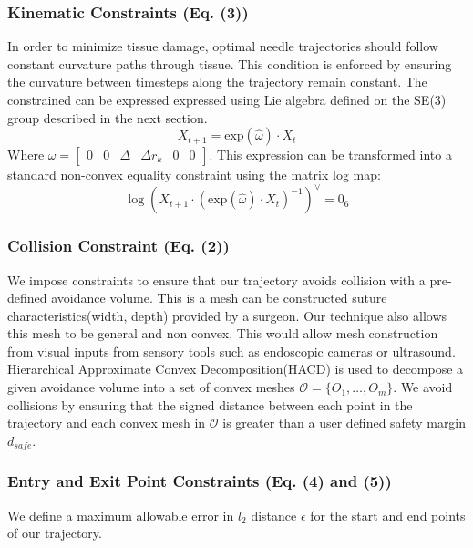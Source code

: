\documentclass[0-suturing.tex]{subfiles}
\begin{document}
\subsubsection{Kinematic Constraints (Eq. (3))}
In order to minimize tissue damage, optimal needle trajectories should follow constant curvature paths through tissue. This condition is enforced by ensuring the curvature between timesteps along the trajectory remain 
constant. The constrained can be expressed expressed using Lie algebra defined on the SE(3) group described in the next section.
\begin{equation}
    X_{t+1} =  \text{exp}(\hat{\omega}) \cdot X_{t}
\end{equation}
Where $\omega = \begin{bmatrix} 0 & 0 & \Delta & \Delta r_k & 0 & 0\end{bmatrix}$.
This expression can be transformed into a standard non-convex equality constraint using the matrix log map:
\begin{equation}
    \log(X_{t+1} \cdot (\text{exp}(\hat{\omega}) \cdot X_{t})^{-1})^{\vee} = 0_6   
\end{equation}

\subsubsection{Collision Constraint (Eq. (2))}
We impose constraints to ensure that our trajectory avoids collision with a pre-defined avoidance volume.
This is a mesh can be constructed suture characteristics(width, depth) provided by a surgeon. Our technique
also allows this mesh to be general and non convex. This would allow mesh construction from visual inputs from sensory tools such as endoscopic cameras or ultrasound.  Hierarchical Approximate Convex Decomposition(HACD)  is used to decompose a given avoidance volume into a set of convex meshes 
$\mathcal{O} = \{O_1, \ldots, O_m\}$. We avoid collisions by ensuring that the signed distance between each 
point in the trajectory and each convex mesh in $\mathcal{O}$ is greater than a user defined safety margin $d_{safe}$. 


\subsubsection{Entry and Exit Point Constraints (Eq. (4) and (5))}
We define a maximum allowable error in $l_2$ distance $\epsilon$ for the start and end points of our trajectory.
\end{document}
